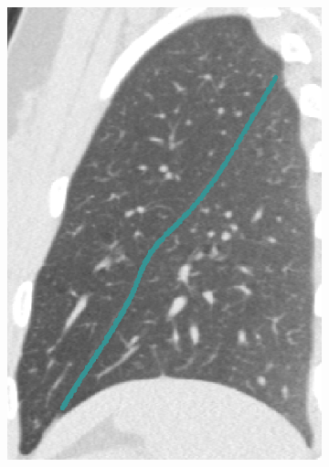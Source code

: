 {\begin{figure}[htbp]
\begin{subfigure}{.25\linewidth}
  \includegraphics[width=\linewidth,trim={{.0\wd0} {.0\wd0} {.0\wd0} {.0\wd0}},clip]{Segmentation/Image/H1335_FRC_PCAInitial_Sagittal.png}
  \caption{}
  \label{fig:HLASegmentationResults-b} 
\end{subfigure}
\hspace{.3in} %
\begin{subfigure}{.25\linewidth}%

\end{subfigure}
\end{figure}}
